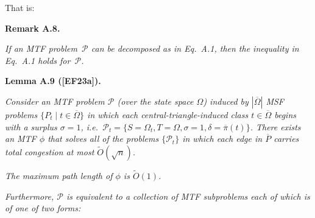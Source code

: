 That is:\par





\par\medskip\noindent\textbf{\textbf{Remark A.8}\textbf{.}}\par



\emph{If an MTF problem $\mathcal{P}$ can be decomposed as in Eq. A.1, then the inequality in Eq. A.1 holds for $\mathcal{P}$.}\par







\par\medskip\noindent\textbf{\textbf{Lemma A.9}\textbf{ }([EF23a])\textbf{.}}\par



\emph{Consider an MTF problem $\mathcal{P}$ (over the state space $\Omega$) induced by $|\overline{\Omega}|$ MSF problems $\{P_{t}\mid t\in\overline{\Omega}\}$ in which each central-triangle-induced class $t\in\overline{\Omega}$ begins with a surplus $\sigma=1$, i.e. $\mathcal{P}_{t}=\{S=\Omega_{t},T=\Omega,\sigma=1,\delta=\overline{\pi}(t)\}$. There exists an MTF $\phi$ that solves all of the problems $\{\mathcal{P}_{t}\}$ in which each edge in $\overline{P}$ carries total congestion at most $\widetilde{O}(\sqrt{n})$.}\par




\emph{The maximum path length of $\phi$ is $\widetilde{O}(1)$.}\par




\emph{Furthermore, $\mathcal{P}$ is equivalent to a collection of MTF subproblems each of which is of one of two forms:}\par


